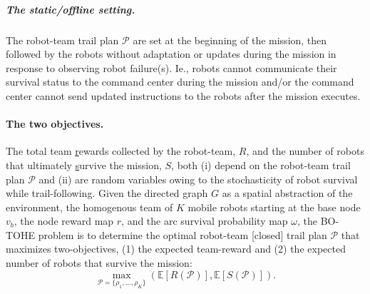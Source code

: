 \documentclass[11pt, oneside]{article}
\begin{document}
\vspace{-\baselineskip}
\subparagraph{The static/offline setting.} 
The robot-team trail plan $\mathcal{P}$ are set at the beginning of the mission, then followed by the robots without adaptation or updates during the mission in response to observing robot failure(s).
Ie., robots cannot communicate their survival status to the command center during the mission and/or the command center cannot send updated instructions to the robots after the mission executes.

\paragraph{The two objectives.}
The total team \underline{r}ewards collected by the robot-team, $R$, and the number of robots that ultimately \underline{s}urvive the mission, $S$, both (i) depend on the robot-team trail plan $\mathcal{P}$ and (ii) are random variables owing to the stochasticity of robot survival while trail-following.
Given 
the directed graph $G$ as a spatial abstraction of the environment, 
the homogenous team of $K$ mobile robots starting at the base node $v_b$,
the node reward map $r$, and the arc survival probability map $\omega$, 
the BO-TOHE problem is to determine the optimal robot-team [closed] trail plan $\mathcal{P}$ that maximizes two-objectives, (1) the expected team-reward and (2) the expected number of robots that survive the mission:
\begin{equation}
\max_{\mathcal{P}=\{\rho_1, ..., \rho_K\}} \left( \mathbb{E}[R(\mathcal{P})], \mathbb{E}[S(\mathcal{P})] \right).
\label{eq:the_two_objs}
\end{equation}
\end{document}
